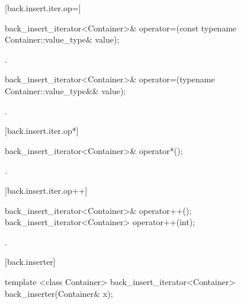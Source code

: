 [back.insert.iter.op=]{}

%
\begin{itemdecl}
back_insert_iterator<Container>&
  operator=(const typename Container::value_type& value);
\end{itemdecl}

\begin{itemdescr}
\pnum
\effects
{}

\pnum
\returns
{}.
\end{itemdescr}

%
\begin{itemdecl}
back_insert_iterator<Container>&
  operator=(typename Container::value_type&& value);
\end{itemdecl}

\begin{itemdescr}
\pnum
\effects
{}

\pnum
\returns
{}.
\end{itemdescr}

[back.insert.iter.op*]{}

%
\begin{itemdecl}
back_insert_iterator<Container>& operator*();
\end{itemdecl}

\begin{itemdescr}
\pnum
\returns
{}.
\end{itemdescr}

[back.insert.iter.op++]{}

%
\begin{itemdecl}
back_insert_iterator<Container>& operator++();
back_insert_iterator<Container>  operator++(int);
\end{itemdecl}

\begin{itemdescr}
\pnum
\returns
{}.
\end{itemdescr}

[back.inserter]{ }

%
\begin{itemdecl}
template <class Container>
  back_insert_iterator<Container> back_inserter(Container& x);
\end{itemdecl}

